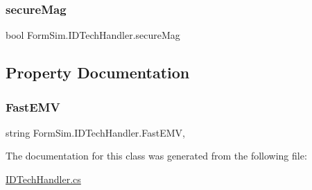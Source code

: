 \subsubsection{\texorpdfstring{secure\+Mag}{secureMag}}
{\footnotesize\ttfamily bool Form\+Sim.\+I\+D\+Tech\+Handler.\+secure\+Mag}



\subsection{Property Documentation}
\mbox{\label{class_form_sim_1_1_i_d_tech_handler_a5d9c224bcb3915493029fc7b58df2b97}} 
\subsubsection{\texorpdfstring{Fast\+E\+MV}{FastEMV}}
{\footnotesize\ttfamily string Form\+Sim.\+I\+D\+Tech\+Handler.\+Fast\+E\+MV\hspace{0.3cm}{\ttfamily [get]}, {\ttfamily [set]}}



The documentation for this class was generated from the following file\+:\begin{DoxyCompactItemize}
\item 
\mbox{\hyperlink{_i_d_tech_handler_8cs}{I\+D\+Tech\+Handler.\+cs}}\end{DoxyCompactItemize}
